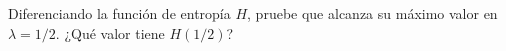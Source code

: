 \begin{statement}{28}
  Diferenciando la funci\'on de entrop\'ia $H$, pruebe que alcanza su m\'aximo valor en
  $\lambda = 1 / 2$. ¿Qu\'e valor tiene $H(1 / 2)$?
\end{statement}